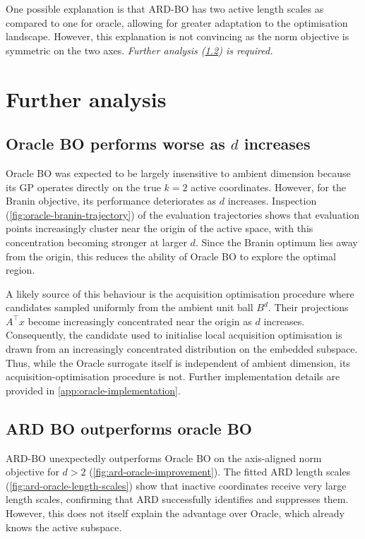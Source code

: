\documentclass[10pt]{article}
\begin{document}
One possible explanation is that ARD-BO has two active length scales as compared to one for oracle, allowing for greater adaptation to the optimisation landscape. However, this explanation is not convincing as the $\mathrm{norm}$ objective is symmetric on the two axes. \textit{Further analysis (\cref{subsec:ard-outperform-oracle-problem}) is required.}

\section{Further analysis}
\subsection{Oracle BO performs worse as $d$ increases}
\label{subsec:oracle-dim-problem}
Oracle BO was expected to be largely insensitive to ambient dimension because its GP operates directly on the true \(k=2\) active coordinates. However, for the Branin objective, its performance deteriorates as \(d\) increases. Inspection (\cref{fig:oracle-branin-trajectory}) of the evaluation trajectories shows that evaluation points increasingly cluster near the origin of the active space, with this concentration becoming stronger at larger \(d\). Since the Branin optimum lies away from the origin, this reduces the ability of Oracle BO to explore the optimal region.

A likely source of this behaviour is the acquisition optimisation procedure where candidates sampled uniformly from the ambient unit ball \(B^d\). Their projections \(A^\top x\) become increasingly concentrated near the origin as \(d\) increases. Consequently, the candidate used to initialise local acquisition optimisation is drawn from an increasingly concentrated distribution on the embedded subspace. Thus, while the Oracle surrogate itself is independent of ambient dimension, its acquisition-optimisation procedure is not. Further implementation details are provided in \cref{app:oracle-implementation}.
 

\subsection{ARD BO outperforms oracle BO}
\label{subsec:ard-outperform-oracle-problem}
ARD-BO unexpectedly outperforms Oracle BO on the axis-aligned norm objective for \(d>2\) (\cref{fig:ard-oracle-improvement}). The fitted ARD length scales (\cref{fig:ard-oracle-length-scales}) show that inactive coordinates receive very large length scales, confirming that ARD successfully identifies and suppresses them. However, this does not itself explain the advantage over Oracle, which already knows the active subspace.
\end{document}
